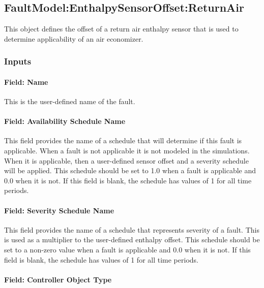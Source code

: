 \subsection{FaultModel:EnthalpySensorOffset:ReturnAir}\label{faultmodelenthalpysensoroffsetreturnair}

This object defines the offset of a return air enthalpy sensor that is used to determine applicability of an air economizer.

\subsubsection{Inputs}\label{inputs-4-020}

\paragraph{Field: Name}\label{field-name-4-017}

This is the user-defined name of the fault.

\paragraph{Field: Availability Schedule Name}\label{field-availability-schedule-name-4-004}

This field provides the name of a schedule that will determine if this fault is applicable. When a fault is not applicable it is not modeled in the simulations. When it is applicable, then a user-defined sensor offset and a severity schedule will be applied. This schedule should be set to 1.0 when a fault is applicable and 0.0 when it is not. If this field is blank, the schedule has values of 1 for all time periods.

\paragraph{Field: Severity Schedule Name}\label{field-severity-schedule-name-4}

This field provides the name of a schedule that represents severity of a fault. This is used as a multiplier to the user-defined enthalpy offset. This schedule should be set to a non-zero value when a fault is applicable and 0.0 when it is not. If this field is blank, the schedule has values of 1 for all time periods.

\paragraph{Field: Controller Object Type}\label{field-controller-object-type-4}

